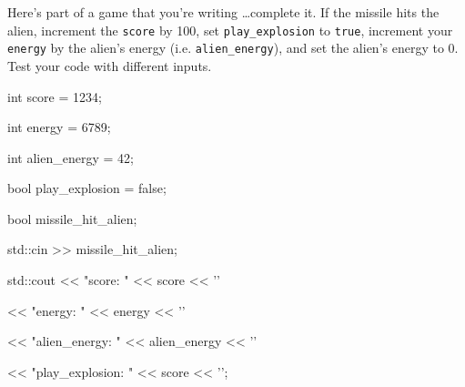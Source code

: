 Here's part of a game that you're writing \dots complete it. If the missile hits the alien, increment the \verb!score! by 100, set \verb!play_explosion! to \verb`true`, increment your \verb!energy! by the alien's energy (i.e. \verb`alien_energy`), and set the alien's energy to 0. Test your code with different inputs.

\begin{console}

int score = 1234;

int energy = 6789;

int alien_energy = 42;

bool play_explosion = false;

bool missile_hit_alien;

std::cin >> missile_hit_alien;





std::cout << "score: " << score << '\n'

          << "energy: " << energy << '\n'

          << "alien_energy: " << alien_energy << '\n'

          << "play_explosion: " << score << '\n';

\end{console}


